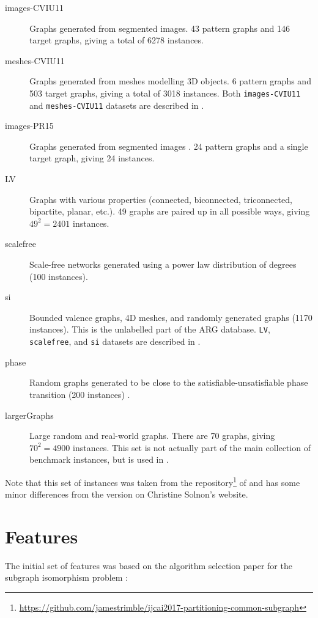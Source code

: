\documentclass{article}
\theoremstyle{definition}
\begin{document}
\begin{description}
\item[images-CVIU11] Graphs generated from segmented images. 43 pattern graphs
  and 146 target graphs, giving a total of 6278 instances.
\item[meshes-CVIU11] Graphs generated from meshes modelling 3D
  objects. 6 pattern graphs and 503 target graphs, giving a total of 3018
  instances. Both \texttt{images-CVIU11} and \texttt{meshes-CVIU11} datasets are
  described in \cite{DBLP:journals/cviu/DamiandSHJS11}.
\item[images-PR15] Graphs generated from segmented images
  \cite{DBLP:journals/pr/SolnonDHJ15}. 24 pattern graphs and a single target
  graph, giving 24 instances.
\item[LV] Graphs with various properties (connected, biconnected, triconnected,
  bipartite, planar, etc.). 49 graphs are paired up in all possible ways, giving
  $49^2=2401$ instances.
\item[scalefree] Scale-free networks generated using a power law distribution of
  degrees (100 instances).
\item[si] Bounded valence graphs, 4D meshes, and randomly generated graphs (1170
  instances). This is the unlabelled part of the ARG database. \texttt{LV},
  \texttt{scalefree}, and \texttt{si} datasets are described in
  \cite{DBLP:journals/ai/Solnon10, DBLP:journals/constraints/ZampelliDS10}.
\item[phase] Random graphs generated to be close to the
  satisfiable-unsatisfiable phase transition (200 instances)
  \cite{DBLP:conf/ijcai/McCreeshPT16}.
\item[largerGraphs] Large random and real-world graphs. There are 70 graphs,
  giving $70^2=4900$ instances. This set is not actually part of the main
  collection of benchmark instances, but is used in
  \cite{DBLP:conf/aaai/HoffmannMR17, DBLP:conf/lion/KotthoffMS16,
    DBLP:conf/ijcai/McCreeshPT17}.
\end{description}

Note that this set of instances was taken from the
repository\footnote{\url{https://github.com/jamestrimble/ijcai2017-partitioning-common-subgraph}}
of \cite{DBLP:conf/ijcai/McCreeshPT17} and has some minor differences from the
version on Christine Solnon's website.

\section{Features}
The initial set of features was based on the algorithm selection paper for the subgraph isomorphism
problem \cite{DBLP:conf/lion/KotthoffMS16}:
\end{document}
